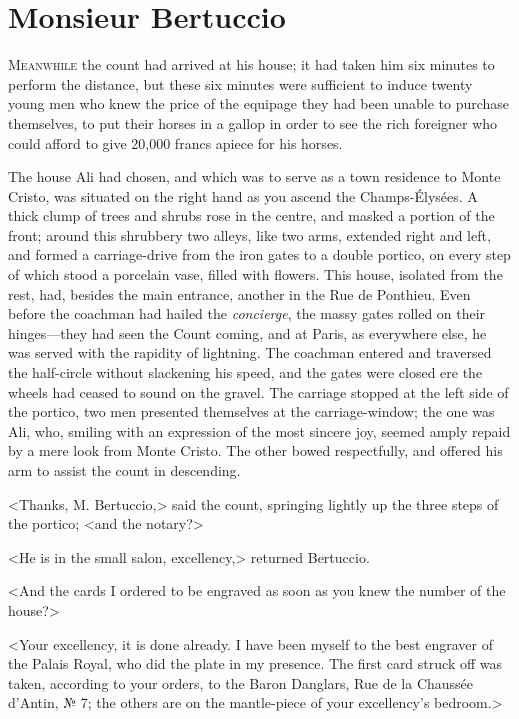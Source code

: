 \chapter{Monsieur Bertuccio} 

 \lettrine{M}{eanwhile} the count had arrived at his house; it had taken him six minutes to perform the distance, but these six minutes were sufficient to induce twenty young men who knew the price of the equipage they had been unable to purchase themselves, to put their horses in a gallop in order to see the rich foreigner who could afford to give 20,000 francs apiece for his horses. 

 The house Ali had chosen, and which was to serve as a town residence to Monte Cristo, was situated on the right hand as you ascend the Champs-Élysées. A thick clump of trees and shrubs rose in the centre, and masked a portion of the front; around this shrubbery two alleys, like two arms, extended right and left, and formed a carriage-drive from the iron gates to a double portico, on every step of which stood a porcelain vase, filled with flowers. This house, isolated from the rest, had, besides the main entrance, another in the Rue de Ponthieu. Even before the coachman had hailed the \textit{concierge}, the massy gates rolled on their hinges—they had seen the Count coming, and at Paris, as everywhere else, he was served with the rapidity of lightning. The coachman entered and traversed the half-circle without slackening his speed, and the gates were closed ere the wheels had ceased to sound on the gravel. The carriage stopped at the left side of the portico, two men presented themselves at the carriage-window; the one was Ali, who, smiling with an expression of the most sincere joy, seemed amply repaid by a mere look from Monte Cristo. The other bowed respectfully, and offered his arm to assist the count in descending. 

 <Thanks, M. Bertuccio,> said the count, springing lightly up the three steps of the portico; <and the notary?> 

 <He is in the small salon, excellency,> returned Bertuccio. 

 <And the cards I ordered to be engraved as soon as you knew the number of the house?> 

 <Your excellency, it is done already. I have been myself to the best engraver of the Palais Royal, who did the plate in my presence. The first card struck off was taken, according to your orders, to the Baron Danglars, Rue de la Chaussée d'Antin, № 7; the others are on the mantle-piece of your excellency's bedroom.> 


